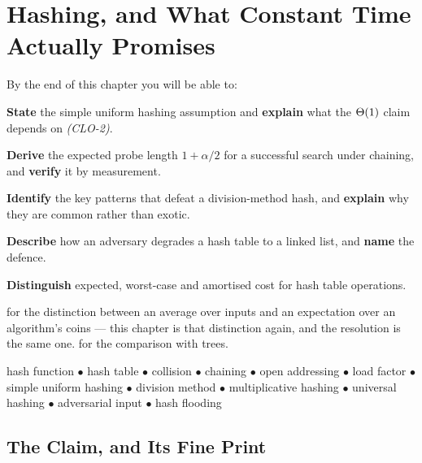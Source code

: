 \chapter{Hashing, and What Constant Time Actually Promises}\label{ch:hashing}

\begin{outcomes}
By the end of this chapter you will be able to:
\begin{tight}
  \item \textbf{State} the simple uniform hashing assumption and
        \textbf{explain} what the $\Theta(1)$ claim depends on \emph{(CLO-2)}.
  \item \textbf{Derive} the expected probe length $1 + \alpha/2$ for a
        successful search under chaining, and \textbf{verify} it by
        measurement.
  \item \textbf{Identify} the key patterns that defeat a division-method hash,
        and \textbf{explain} why they are common rather than exotic.
  \item \textbf{Describe} how an adversary degrades a hash table to a linked
        list, and \textbf{name} the defence.
  \item \textbf{Distinguish} expected, worst-case and amortised cost for hash
        table operations.
\end{tight}
\end{outcomes}

\begin{prereq}
 for the distinction between an average over inputs and an
expectation over an algorithm's coins --- this chapter is that distinction
again, and the resolution is the same one.  for the
comparison with trees.
\end{prereq}

\begin{keyterms}
hash function $\bullet$ hash table $\bullet$ collision $\bullet$ chaining
$\bullet$ open addressing $\bullet$ load factor $\bullet$ simple uniform
hashing $\bullet$ division method $\bullet$ multiplicative hashing $\bullet$
universal hashing $\bullet$ adversarial input $\bullet$ hash flooding
\end{keyterms}

\section{The Claim, and Its Fine Print}

